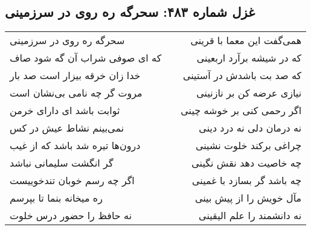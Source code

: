 \begin{center}
\section*{غزل شماره ۴۸۳: سحرگه ره روی در سرزمینی}
\label{sec:sh483}
\begin{longtable}{l p{0.5cm} r}
سحرگه ره روی در سرزمینی
&&
همی‌گفت این معما با قرینی
\\
که ای صوفی شراب آن گه شود صاف
&&
که در شیشه برآرد  اربعینی
\\
خدا زان خرقه بیزار است صد بار
&&
که صد بت باشدش در آستینی
\\
مروت گر چه نامی بی‌نشان است
&&
نیازی عرضه کن بر نازنینی
\\
ثوابت باشد ای دارای خرمن
&&
اگر رحمی کنی بر خوشه چینی
\\
نمی‌بینم نشاط عیش در کس
&&
نه درمان دلی نه درد دینی
\\
درون‌ها تیره شد باشد که از غیب
&&
چراغی برکند خلوت نشینی
\\
گر انگشت سلیمانی نباشد
&&
چه خاصیت دهد نقش نگینی
\\
اگر چه رسم خوبان تندخوییست
&&
چه باشد گر بسازد با غمینی
\\
ره میخانه بنما تا بپرسم
&&
مآل خویش را از پیش بینی
\\
نه حافظ را حضور درس خلوت
&&
نه دانشمند را علم الیقینی
\\
\end{longtable}
\end{center}
